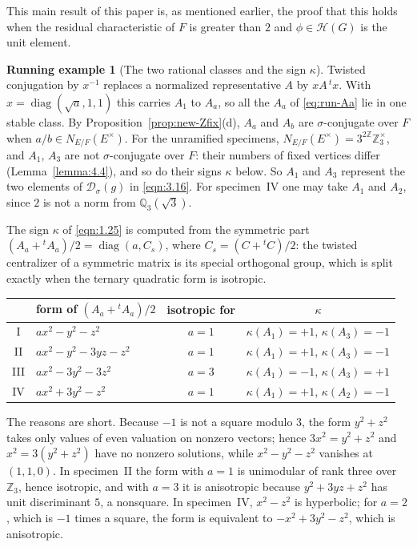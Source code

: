 \documentclass[12pt,letterpaper]{amsart}
\numberwithin{equation}{section}
\theoremstyle{definition}
\newtheorem{runex}[theorem]{Running example}
\theoremstyle{plain}
\providecommand{\cal}{\mathcal}
\def\hhh{{\cal H}}
\def\ddd{{\cal D}}
\begin{document}
This main result of this paper is, as mentioned earlier, the proof that
this holds when the residual characteristic of $F$ is greater than $2$ and
$\phi \in \hhh (G)$ is the unit element. 







\begin{runex}[The two rational classes and the sign $\kappa$]
\label{run:kappa}
Twisted conjugation by $x^{-1}$ replaces a normalized representative
$A$ by $xA\,{}^tx$. With $x=\operatorname{diag}(\sqrt a,1,1)$ this
carries $A_1$ to $A_a$, so all the $A_a$ of \eqref{eq:run-Aa} lie in
one stable class. By Proposition~\ref{prop:new-Zfix}(d), $A_a$ and
$A_b$ are $\sigma$-conjugate over $F$ when $a/b\in N_{E/F}(E^\times)$.
For the unramified specimens, $N_{E/F}(E^\times)=3^{2\mathbb Z}\mathbb Z_3^\times$,
and $A_1$, $A_3$ are not $\sigma$-conjugate over $F$: their numbers
of fixed vertices differ (Lemma~\ref{lemma:4.4}), and so do their
signs $\kappa$ below. So $A_1$ and
$A_3$ represent the two elements of $\ddd_\sigma(g)$ in
\eqref{eqn:3.16}. For specimen~IV one may take $A_1$ and $A_2$, since
$2$ is not a norm from $\mathbb Q_3(\sqrt3)$.

The sign $\kappa$ of \eqref{eqn:1.25} is computed from the symmetric
part $(A_a+{}^tA_a)/2=\operatorname{diag}(a,C_s)$, where
$C_s=(C+{}^tC)/2$: the twisted centralizer of a symmetric matrix is
its special orthogonal group, which is split exactly when the ternary
quadratic form is isotropic.
\begin{center}
\small
\renewcommand{\arraystretch}{1.25}
\begin{tabular}{@{}clcc@{}}
\toprule
 & form of $(A_a+{}^tA_a)/2$ & isotropic for & $\kappa$\\
\midrule
I & $ax^2-y^2-z^2$ & $a=1$ & $\kappa(A_1)=+1$, $\kappa(A_3)=-1$\\
II & $ax^2-y^2-3yz-z^2$ & $a=1$ & $\kappa(A_1)=+1$, $\kappa(A_3)=-1$\\
III & $ax^2-3y^2-3z^2$ & $a=3$ & $\kappa(A_1)=-1$, $\kappa(A_3)=+1$\\
IV & $ax^2+3y^2-z^2$ & $a=1$ & $\kappa(A_1)=+1$, $\kappa(A_2)=-1$\\
\bottomrule
\end{tabular}
\end{center}
The reasons are short. Because $-1$ is not a square modulo $3$, the
form $y^2+z^2$ takes only values of even valuation on nonzero vectors;
hence $3x^2=y^2+z^2$ and $x^2=3(y^2+z^2)$ have no nonzero solutions,
while $x^2-y^2-z^2$ vanishes at $(1,1,0)$. In specimen~II the form
with $a=1$ is unimodular of rank three over $\mathbb Z_3$, hence
isotropic, and with $a=3$ it is anisotropic because $y^2+3yz+z^2$ has
unit discriminant $5$, a nonsquare. In specimen~IV, $x^2-z^2$ is
hyperbolic; for $a=2$, which is $-1$ times a square, the form is
equivalent to $-x^2+3y^2-z^2$, which is anisotropic.


\end{runex}
\end{document}
